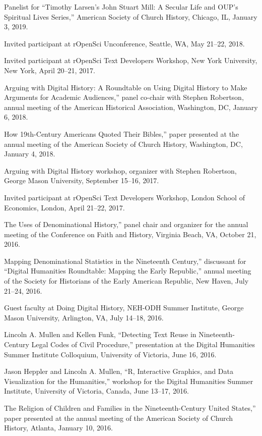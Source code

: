 \documentclass[11pt]{article}
\begin{document}
Panelist for ``Timothy Larsen's John Stuart Mill: A Secular Life and OUP's Spiritual Lives Series,'' American Society of Church History, Chicago, IL, January 3, 2019.

Invited participant at rOpenSci Unconference, Seattle, WA, May 21--22, 2018.

Invited participant at rOpenSci Text Developers Workshop, New York University, New York, April 20--21, 2017.

\noindent{}Arguing with Digital History: A Roundtable on Using Digital History to Make Arguments for Academic Audiences,'' panel co-chair with Stephen Robertson, annual meeting of the American Historical Association, Washington, DC, January 6, 2018.

\noindent{}How 19th-Century Americans Quoted Their Bibles,'' paper presented at the annual meeting of the American Society of Church History, Washington, DC, January 4, 2018.

Arguing with Digital History workshop, organizer with Stephen Robertson, George Mason University, September 15--16, 2017.

Invited participant at rOpenSci Text Developers Workshop, London School of Economics, London, April 21--22, 2017.

\noindent{}The Uses of Denominational History,'' panel chair and organizer for the annual meeting of the Conference on Faith and History, Virginia Beach, VA, October 21, 2016.

\noindent{}Mapping Denominational Statistics in the Nineteenth Century,'' discussant for ``Digital Humanities Roundtable: Mapping the Early Republic,'' annual meeting of the Society for Historians of the Early American Republic, New Haven, July 21--24, 2016.

Guest faculty at Doing Digital History, NEH-ODH Summer Institute, George Mason University, Arlington, VA, July 14--18, 2016.

Lincoln A. Mullen and Kellen Funk, ``Detecting Text Reuse in Nineteenth-Century Legal Codes of Civil Procedure,'' presentation at the Digital Humanities Summer Institute Colloquium, University of Victoria, June 16, 2016.

Jason Heppler and Lincoln A. Mullen, ``R, Interactive Graphics, and Data Visualization for the Humanities,'' workshop for the Digital Humanities Summer Institute, University of Victoria, Canada, June 13--17, 2016.  

\noindent{}The Religion of Children and Families in the Nineteenth-Century United States,'' paper presented at the annual meeting of the American Society of Church History, Atlanta, January 10, 2016.
\end{document}
